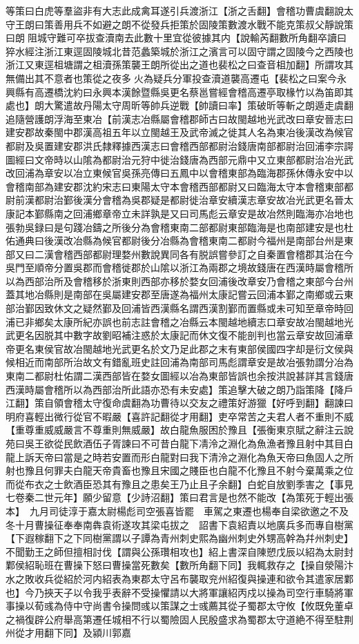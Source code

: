 等策曰白虎等羣盜非有大志此成禽耳遂引兵渡浙江【浙之舌翻】會稽功曹虞翻說太守王朗曰策善用兵不如避之朗不從發兵拒策於固陵策數渡水戰不能克策叔父靜說策曰朗阻城守難可卒拔查瀆南去此數十里宜從彼據其内【說輸芮翻數所角翻卒讀曰猝水經注浙江東逕固陵城北昔范蠡築城於浙江之濱言可以固守謂之固陵今之西陵也浙江又東逕柤塘謂之柤瀆孫策襲王朗所從出之道也裴松之曰查音柤加翻】所謂攻其無備出其不意者也策從之夜多火為疑兵分軍投查瀆道襲高遷屯【裴松之曰案今永興縣有高遷橋沈約曰永興本漢餘暨縣吳更名蔡邕嘗經會稽高遷亭取椽竹以為笛即其處也】朗大驚遣故丹陽太守周昕等帥兵逆戰【帥讀曰率】策破昕等斬之朗遁走虞翻追隨營護朗浮海至東冶【前漢志冶縣屬會稽郡師古曰故閩越地光武改曰章安晉志曰建安郡故秦閩中郡漢高祖五年以立閩越王及武帝滅之徙其人名為東冶後漢改為候官都尉及吳置建安郡洪氏隸釋據西漢志曰會稽西部都尉治錢唐南部都尉治回浦李宗諤圖經曰文帝時以山隂為都尉治元狩中徙治錢唐為西部元鼎中又立東部都尉治冶光武改回浦為章安以冶立東候官吳孫亮傳曰五鳳中以會稽東部為臨海郡孫休傳永安中以會稽南部為建安郡沈約宋志曰東陽太守本會稽西部都尉又曰臨海太守本會稽東部都尉前漢都尉治鄞後漢分會稽為吳郡疑是都尉徙治章安續漢志章安故冶光武更名晉太康記本鄞縣南之回浦鄉章帝立未詳孰是又曰司馬彪云章安是故冶然則臨海亦冶地也張勃吳録曰是句踐冶鑄之所後分為會稽東南二部都尉東部臨海是也南部建安是也杜佑通典曰後漢改冶縣為候官都尉後分冶縣為會稽東南二都尉今福州是南部台州是東部又曰二漢會稽西部都尉理婺州數說異同各有脱誤嘗參訂之自秦置會稽郡其治在今吳門至順帝分置吳郡而會稽徙郡於山隂以浙江為兩郡之境故錢唐在西漢時屬會稽所以為西部治所及會稽移於浙東則西部亦移於婺女回浦後改章安乃會稽之東部今台州蓋其地冶縣則是南部在吳屬建安郡至唐遂為福州太康記嘗云回浦本鄞之南鄉或云東部治鄞因致休文之疑然鄞及回浦皆西漢縣名謂西漢割鄞而置縣或未可知至章帝時回浦已非鄉矣太康所紀亦誤也前志註會稽之冶縣云本閩越地續志口章安故冶閩越地光武更名因脱其中數字故劉昭補注惑於太康記而休文復不能剖判也當云章安故回浦章帝更名東侯官故冶閩越地光武更名於文乃足此郡之末有東部侯國四字却是衍文侯與候相近而南部所治故文有錯亂班史註回浦為南部司馬彪謂章安是故冶張勃謂分冶為東南二都尉杜佑謂二漢西部皆在婺女圖經以冶為東部皆誤也余按洪說甚詳其言錢唐西漢時屬會稽所以為西部治所此語亦恐有未安處】策追擊大破之朗乃詣策降【降戶江翻】策自領會稽太守復命虞翻為功曹待以交友之禮策好游獵【好呼到翻】翻諫曰明府喜輕出微行從官不暇嚴【喜許記翻從才用翻】吏卒常苦之夫君人者不重則不威【重尊重威威嚴言不尊重則無威嚴】故白龍魚服困於豫且【張衡東京賦之辭注云說苑曰吳王欲從民飲酒伍子胥諫曰不可昔白龍下凊泠之淵化為魚漁者豫且射中其目白龍上訴天帝曰當是之時若安置而形白龍對曰我下清泠之淵化為魚天帝曰魚固人之所射也豫且何罪夫白龍天帝貴畜也豫且宋國之賤臣也白龍不化豫且不射今棄萬乘之位而從布衣之士飲酒臣恐其有豫且之患矣王乃止且子余翻】白蛇自放劉季害之【事見七卷秦二世元年】願少留意【少詩沼翻】策曰君言是也然不能改【為策死于輕出張本】　九月司徒淳于嘉太尉楊彪司空張喜皆罷　車駕之東遷也楊奉自梁欲邀之不及冬十月曹操征奉奉南犇袁術遂攻其梁屯拔之　詔書下袁紹責以地廣兵多而專自樹黨【下遐稼翻下之下同樹黨謂以子譚為青州刺史熙為幽州刺史外甥高幹為幷州刺史】不聞勤王之師但擅相討伐【謂與公孫瓚相攻也】紹上書深自陳愬戊辰以紹為太尉封鄴侯紹恥班在曹操下怒曰曹操當死數矣【數所角翻下同】我輒救存之【操自滎陽汴水之敗收兵從紹於河内紹表為東郡太守呂布襲取兖州紹復與操連和欲令其遣家居鄴也】今乃挾天子以令我乎表辭不受操懼請以大將軍讓紹丙戍以操為司空行車騎將軍事操以荀彧為侍中守尚書令操問彧以策謀之士彧薦其從子蜀郡太守攸【攸既免董卓之禍復辟公府舉高第遷任城相不行以蜀險固人民殷盛求為蜀郡太守道絶不得至駐荆州從才用翻下同】及潁川郭嘉